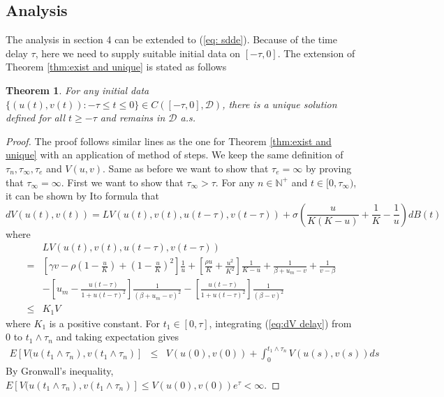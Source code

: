 \documentclass{aims}
\newtheorem{theorem}{Theorem}[section]
\theoremstyle{definition}
\begin{document}
 \subsection{Analysis}
 
 The analysis in section 4 can be extended
 to (\ref{eq: sdde}). Because of the time delay $\tau$, here we need
 to supply suitable initial data on $[-\tau,0]$. The extension of
 Theorem \ref{thm:exist and unique} is stated as follows 
 \begin{theorem}
 For any initial data $\{(u(t),v(t)):-\tau\le t\le0\}\in C([-\tau,0],\mathcal{D})$,
 there is a unique solution defined for all $t\ge-\tau$ and remains
 in $\mathcal{D}$ a.s.
 \end{theorem}
 
 \begin{proof}
 The proof follows similar lines as the one for Theorem \ref{thm:exist and unique} with
 an application of method of steps. We keep the same definition of
 $\tau_{n},\tau_{\infty},\tau_{e}$ and $V(u,v)$. Same as before we
 want to show that $\tau_{e}=\infty$ by proving that $\tau_{\infty}=\infty$.
 First we want to show that $\tau_{\infty}>\tau$. For any $n\in\mathbb{N}^{+}$
 and $t\in[0,\tau_{\infty})$, it can be shown by Ito formula that
 \begin{equation}
 dV(u(t),v(t))=LV(u(t),v(t),u(t-\tau),v(t-\tau))+\sigma(\frac{u}{K(K-u)}+\frac{1}{K}-\frac{1}{u})dB(t)\label{eq:dV delay}
 \end{equation}
 where 
 \begin{align*}
  & LV(u(t),v(t),u(t-\tau),v(t-\tau))\\
 = & [\gamma v-\rho(1-\frac{u}{K})+(1-\frac{u}{K})^{2}]\frac{1}{u}+[\frac{\rho u}{K}+\frac{u^{2}}{K^{2}}]\frac{1}{K-u}+\frac{1}{\beta+u_{m}-v}+\frac{1}{v-\beta}\\
  & -[u_{m}-\frac{u(t-\tau)}{1+u(t-\tau)^{2}}]\frac{1}{(\beta+u_{m}-v)^{2}}-[\frac{u(t-\tau)}{1+u(t-\tau)^{2}}]\frac{1}{(\beta-v)^{2}}\\
 \le & K_{1}V
 \end{align*}
 where $K_{1}$ is a positive constant. For $t_{1}\in[0,\tau]$, integrating
 (\ref{eq:dV delay}) from 0 to $t_{1}\land\tau_{n}$ and taking expectation
 gives
 \begin{eqnarray*}
 E[V(u(t_{1}\land\tau_{n}),v(t_{1}\land\tau_{n})] & \le & V(u(0),v(0))+\int_{0}^{t_{1}\land\tau_{n}}V(u(s),v(s))ds
 \end{eqnarray*}
 By Gronwall's inequality, $E[V(u(t_{1}\land\tau_{n}),v(t_{1}\land\tau_{n})]\le V(u(0),v(0))e^{\tau}<\infty$.

\end{proof}
\end{document}
